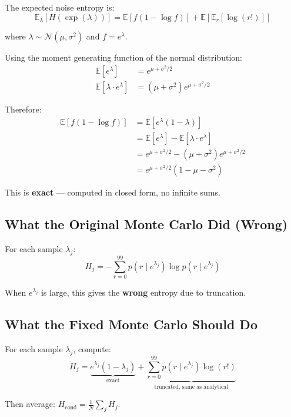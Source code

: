 \documentclass[11pt]{article}
\newcommand{\E}{\mathbb{E}}
\begin{document}
The expected noise entropy is:
\begin{equation}
\E_{\lambda}[H(\exp(\lambda))] = \E[f(1 - \log f)] + \E[\E_r[\log(r!)]]
\end{equation}

where $\lambda \sim \mathcal{N}(\mu, \sigma^2)$ and $f = e^\lambda$.

Using the moment generating function of the normal distribution:
\begin{align}
\E[e^\lambda] &= e^{\mu + \sigma^2/2} \\
\E[\lambda \cdot e^\lambda] &= (\mu + \sigma^2) e^{\mu + \sigma^2/2}
\end{align}

Therefore:
\begin{align}
\E[f(1 - \log f)] &= \E[e^\lambda(1 - \lambda)] \\
&= \E[e^\lambda] - \E[\lambda \cdot e^\lambda] \\
&= e^{\mu + \sigma^2/2} - (\mu + \sigma^2) e^{\mu + \sigma^2/2} \\
&= \boxed{e^{\mu + \sigma^2/2}(1 - \mu - \sigma^2)}
\end{align}

This is \textbf{exact} --- computed in closed form, no infinite sums.

\subsection{What the Original Monte Carlo Did (Wrong)}

For each sample $\lambda_j$:
\begin{equation}
H_j = -\sum_{r=0}^{99} p(r \mid e^{\lambda_j}) \log p(r \mid e^{\lambda_j})
\end{equation}

When $e^{\lambda_j}$ is large, this gives the \textbf{wrong} entropy due to truncation.

\subsection{What the Fixed Monte Carlo Should Do}

For each sample $\lambda_j$, compute:
\begin{equation}
H_j = \underbrace{e^{\lambda_j}(1 - \lambda_j)}_{\text{exact}} + \underbrace{\sum_{r=0}^{99} p(r \mid e^{\lambda_j}) \log(r!)}_{\text{truncated, same as analytical}}
\end{equation}

Then average: $H_{\text{cond}} = \frac{1}{N}\sum_j H_j$.
\end{document}
